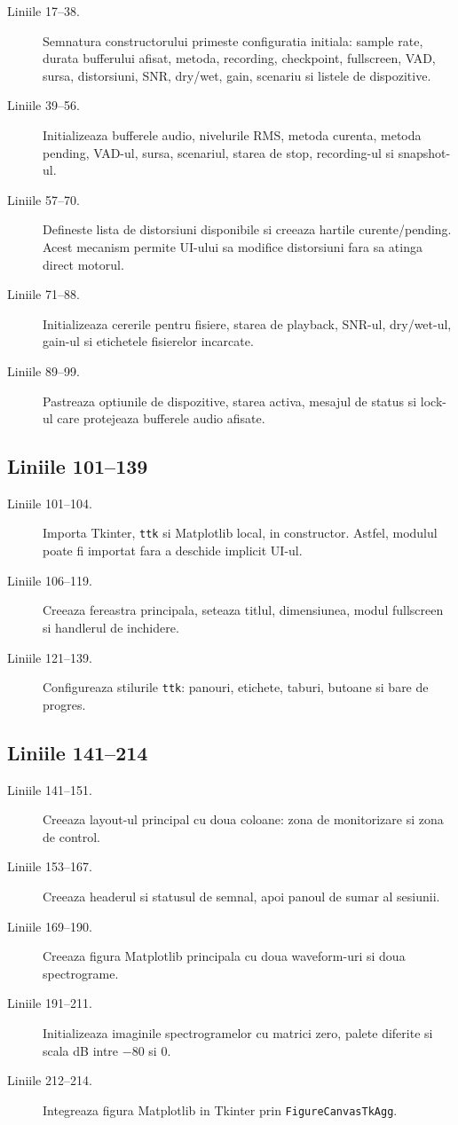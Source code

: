 \documentclass[12pt,a4paper]{report}
\newcommand{\chunk}[3]{\subsection*{Liniile #2--#3}}
\begin{document}
\begin{description}
    \item[Liniile 17--38.] Semnatura constructorului primeste configuratia initiala:
    sample rate, durata bufferului afisat, metoda, recording, checkpoint,
    fullscreen, VAD, sursa, distorsiuni, SNR, dry/wet, gain, scenariu si listele
    de dispozitive.
    \item[Liniile 39--56.] Initializeaza bufferele audio, nivelurile RMS, metoda
    curenta, metoda pending, VAD-ul, sursa, scenariul, starea de stop, recording-ul
    si snapshot-ul.
    \item[Liniile 57--70.] Defineste lista de distorsiuni disponibile si creeaza
    hartile curente/pending. Acest mecanism permite UI-ului sa modifice distorsiuni
    fara sa atinga direct motorul.
    \item[Liniile 71--88.] Initializeaza cererile pentru fisiere, starea de playback,
    SNR-ul, dry/wet-ul, gain-ul si etichetele fisierelor incarcate.
    \item[Liniile 89--99.] Pastreaza optiunile de dispozitive, starea activa,
    mesajul de status si lock-ul care protejeaza bufferele audio afisate.
\end{description}

\chunk{../src/tools/realtime/ui.py}{101}{139}

\begin{description}
    \item[Liniile 101--104.] Importa Tkinter, \texttt{ttk} si Matplotlib local, in
    constructor. Astfel, modulul poate fi importat fara a deschide implicit UI-ul.
    \item[Liniile 106--119.] Creeaza fereastra principala, seteaza titlul,
    dimensiunea, modul fullscreen si handlerul de inchidere.
    \item[Liniile 121--139.] Configureaza stilurile \texttt{ttk}: panouri, etichete,
    taburi, butoane si bare de progres.
\end{description}

\chunk{../src/tools/realtime/ui.py}{141}{214}

\begin{description}
    \item[Liniile 141--151.] Creeaza layout-ul principal cu doua coloane: zona de
    monitorizare si zona de control.
    \item[Liniile 153--167.] Creeaza headerul si statusul de semnal, apoi panoul
    de sumar al sesiunii.
    \item[Liniile 169--190.] Creeaza figura Matplotlib principala cu doua waveform-uri
    si doua spectrograme.
    \item[Liniile 191--211.] Initializeaza imaginile spectrogramelor cu matrici zero,
    palete diferite si scala dB intre \(-80\) si \(0\).
    \item[Liniile 212--214.] Integreaza figura Matplotlib in Tkinter prin
    \texttt{FigureCanvasTkAgg}.
\end{description}
\end{document}
